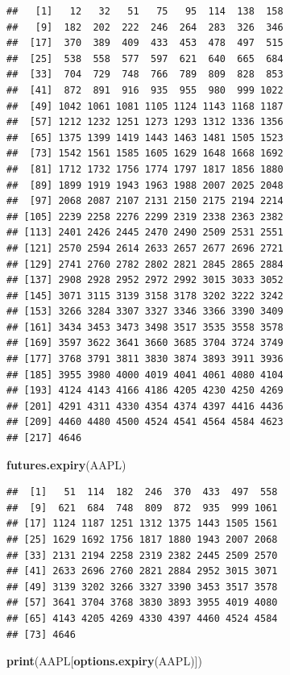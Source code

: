 \documentclass[]{ctexbook}
\newenvironment{Shaded}{\begin{snugshade}}{\end{snugshade}}
\newcommand{\FunctionTok}[1]{\textcolor[rgb]{0.13,0.29,0.53}{\textbf{#1}}}
\newcommand{\NormalTok}[1]{#1}
\begin{document}
\begin{verbatim}
##   [1]   12   32   51   75   95  114  138  158
##   [9]  182  202  222  246  264  283  326  346
##  [17]  370  389  409  433  453  478  497  515
##  [25]  538  558  577  597  621  640  665  684
##  [33]  704  729  748  766  789  809  828  853
##  [41]  872  891  916  935  955  980  999 1022
##  [49] 1042 1061 1081 1105 1124 1143 1168 1187
##  [57] 1212 1232 1251 1273 1293 1312 1336 1356
##  [65] 1375 1399 1419 1443 1463 1481 1505 1523
##  [73] 1542 1561 1585 1605 1629 1648 1668 1692
##  [81] 1712 1732 1756 1774 1797 1817 1856 1880
##  [89] 1899 1919 1943 1963 1988 2007 2025 2048
##  [97] 2068 2087 2107 2131 2150 2175 2194 2214
## [105] 2239 2258 2276 2299 2319 2338 2363 2382
## [113] 2401 2426 2445 2470 2490 2509 2531 2551
## [121] 2570 2594 2614 2633 2657 2677 2696 2721
## [129] 2741 2760 2782 2802 2821 2845 2865 2884
## [137] 2908 2928 2952 2972 2992 3015 3033 3052
## [145] 3071 3115 3139 3158 3178 3202 3222 3242
## [153] 3266 3284 3307 3327 3346 3366 3390 3409
## [161] 3434 3453 3473 3498 3517 3535 3558 3578
## [169] 3597 3622 3641 3660 3685 3704 3724 3749
## [177] 3768 3791 3811 3830 3874 3893 3911 3936
## [185] 3955 3980 4000 4019 4041 4061 4080 4104
## [193] 4124 4143 4166 4186 4205 4230 4250 4269
## [201] 4291 4311 4330 4354 4374 4397 4416 4436
## [209] 4460 4480 4500 4524 4541 4564 4584 4623
## [217] 4646
\end{verbatim}

\begin{Shaded}
\begin{Highlighting}[]
\FunctionTok{futures.expiry}\NormalTok{(AAPL)}
\end{Highlighting}
\end{Shaded}

\begin{verbatim}
##  [1]   51  114  182  246  370  433  497  558
##  [9]  621  684  748  809  872  935  999 1061
## [17] 1124 1187 1251 1312 1375 1443 1505 1561
## [25] 1629 1692 1756 1817 1880 1943 2007 2068
## [33] 2131 2194 2258 2319 2382 2445 2509 2570
## [41] 2633 2696 2760 2821 2884 2952 3015 3071
## [49] 3139 3202 3266 3327 3390 3453 3517 3578
## [57] 3641 3704 3768 3830 3893 3955 4019 4080
## [65] 4143 4205 4269 4330 4397 4460 4524 4584
## [73] 4646
\end{verbatim}

\begin{Shaded}
\begin{Highlighting}[]
\FunctionTok{print}\NormalTok{(AAPL[}\FunctionTok{options.expiry}\NormalTok{(AAPL)])}
\end{Highlighting}
\end{Shaded}
\end{document}
